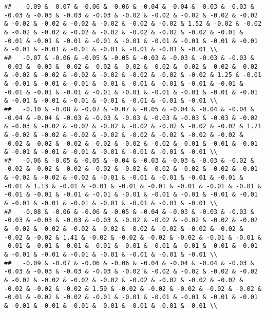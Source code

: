 \documentclass[
]{article}
\begin{document}
\begin{verbatim}
##   -0.09 & -0.07 & -0.06 & -0.06 & -0.04 & -0.04 & -0.03 & -0.03 & -0.03 & -0.03 & -0.03 & -0.03 & -0.02 & -0.02 & -0.02 & -0.02 & -0.02 & -0.02 & -0.02 & -0.02 & -0.02 & -0.02 & -0.02 & 1.52 & -0.02 & -0.02 & -0.02 & -0.02 & -0.02 & -0.02 & -0.02 & -0.02 & -0.02 & -0.01 & -0.01 & -0.01 & -0.01 & -0.01 & -0.01 & -0.01 & -0.01 & -0.01 & -0.01 & -0.01 & -0.01 & -0.01 & -0.01 & -0.01 & -0.01 & -0.01 \\ 
##   -0.07 & -0.06 & -0.05 & -0.05 & -0.03 & -0.03 & -0.03 & -0.03 & -0.03 & -0.03 & -0.02 & -0.02 & -0.02 & -0.02 & -0.02 & -0.02 & -0.02 & -0.02 & -0.02 & -0.02 & -0.02 & -0.02 & -0.02 & -0.02 & 1.25 & -0.01 & -0.01 & -0.01 & -0.01 & -0.01 & -0.01 & -0.01 & -0.01 & -0.01 & -0.01 & -0.01 & -0.01 & -0.01 & -0.01 & -0.01 & -0.01 & -0.01 & -0.01 & -0.01 & -0.01 & -0.01 & -0.01 & -0.01 & -0.01 & -0.01 \\ 
##   -0.10 & -0.08 & -0.07 & -0.07 & -0.05 & -0.04 & -0.04 & -0.04 & -0.04 & -0.04 & -0.03 & -0.03 & -0.03 & -0.03 & -0.03 & -0.03 & -0.02 & -0.03 & -0.02 & -0.02 & -0.02 & -0.02 & -0.02 & -0.02 & -0.02 & 1.71 & -0.02 & -0.02 & -0.02 & -0.02 & -0.02 & -0.02 & -0.02 & -0.02 & -0.02 & -0.02 & -0.02 & -0.02 & -0.02 & -0.02 & -0.01 & -0.01 & -0.01 & -0.01 & -0.01 & -0.01 & -0.01 & -0.01 & -0.01 & -0.01 \\ 
##   -0.06 & -0.05 & -0.05 & -0.04 & -0.03 & -0.03 & -0.03 & -0.02 & -0.02 & -0.02 & -0.02 & -0.02 & -0.02 & -0.02 & -0.02 & -0.02 & -0.01 & -0.02 & -0.02 & -0.02 & -0.01 & -0.01 & -0.01 & -0.01 & -0.01 & -0.01 & 1.13 & -0.01 & -0.01 & -0.01 & -0.01 & -0.01 & -0.01 & -0.01 & -0.01 & -0.01 & -0.01 & -0.01 & -0.01 & -0.01 & -0.01 & -0.01 & -0.01 & -0.01 & -0.01 & -0.01 & -0.01 & -0.01 & -0.01 & -0.01 \\ 
##   -0.08 & -0.06 & -0.06 & -0.05 & -0.04 & -0.03 & -0.03 & -0.03 & -0.03 & -0.03 & -0.03 & -0.03 & -0.02 & -0.02 & -0.02 & -0.02 & -0.02 & -0.02 & -0.02 & -0.02 & -0.02 & -0.02 & -0.02 & -0.02 & -0.02 & -0.02 & -0.02 & 1.41 & -0.02 & -0.02 & -0.02 & -0.02 & -0.01 & -0.01 & -0.01 & -0.01 & -0.01 & -0.01 & -0.01 & -0.01 & -0.01 & -0.01 & -0.01 & -0.01 & -0.01 & -0.01 & -0.01 & -0.01 & -0.01 & -0.01 \\ 
##   -0.09 & -0.07 & -0.06 & -0.06 & -0.04 & -0.04 & -0.04 & -0.03 & -0.03 & -0.03 & -0.03 & -0.03 & -0.02 & -0.02 & -0.02 & -0.02 & -0.02 & -0.02 & -0.02 & -0.02 & -0.02 & -0.02 & -0.02 & -0.02 & -0.02 & -0.02 & -0.02 & -0.02 & 1.59 & -0.02 & -0.02 & -0.02 & -0.02 & -0.02 & -0.01 & -0.02 & -0.02 & -0.01 & -0.01 & -0.01 & -0.01 & -0.01 & -0.01 & -0.01 & -0.01 & -0.01 & -0.01 & -0.01 & -0.01 & -0.01 \\ 

\end{verbatim}
\end{document}

